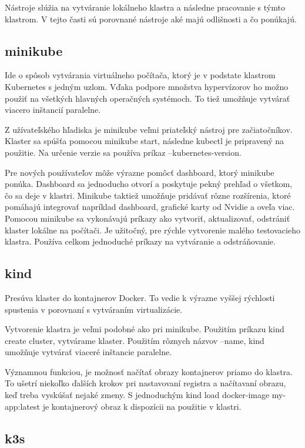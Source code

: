 Nástroje slúžia na vytváranie lokálneho klastra a následne pracovanie s týmto klastrom. V tejto časti sú porovnané nástroje aké majú odlišnosti a čo ponúkajú.
\subsection*{minikube}

Ide o spôsob vytvárania virtuálneho počítača, ktorý je v podstate klastrom Kubernetes s jedným uzlom. Vďaka podpore množstva hypervízorov ho možno použiť na všetkých hlavných operačných systémoch. To tiež umožňuje vytvárať viacero inštancií paralelne.

Z užívateľského hľadiska je minikube veľmi priateľský nástroj pre začiatočníkov. Klaster sa spúšťa pomocou minikube start, následne kubectl je pripravený na použitie. Na určenie verzie sa používa príkaz --kubernetes-version.

Pre nových používateľov môže výrazne pomôcť dashboard, ktorý minikube ponúka. Dashboard sa jednoducho otvorí a poskytuje pekný prehľad o všetkom, čo sa deje v klastri. Minikube taktiež umožňuje pridávať rôzne rozšírenia, ktoré pomáhajú integrovať napríklad dashboard, grafické karty od Nvidie a oveľa viac. Pomocou minikube sa vykonávajú príkazy ako vytvoriť, aktualizovať, odstrániť klaster lokálne na počítači. Je užitočný, pre rýchle vytvorenie malého testovacieho klastra. Používa celkom jednoduché príkazy na vytváranie a odstráňovanie.

\subsection*{kind}

Presúva klaster do kontajnerov Docker. To vedie k výrazne vyššej rýchlosti spustenia v porovnaní s vytváraním virtualizácie.

Vytvorenie klastra je veľmi podobné ako pri minikube. Použitím príkazu kind create cluster, vytvárame klaster. Použitím rôznych názvov  --name, kind umožňuje vytvárať viaceré inštancie paralelne.

Významnou funkciou, je možnosť načítať obrazy kontajnerov priamo do klastra. To ušetrí niekoľko ďalších krokov pri nastavovaní registra a načítavaní obrazu, keď treba vyskúšať nejaké zmeny. S jednoduchým kind load docker-image my-app:latest je kontajnerový obraz k dispozícii na použitie v klastri.

\subsection*{k3s}

